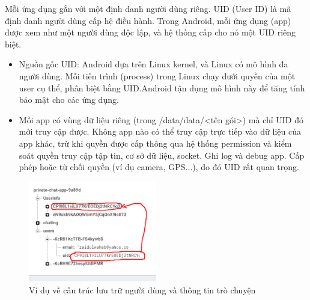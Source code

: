 \renewcommand{\labelitemi}{--}    
    \begin{flushleft}
        \hspace*{0.8cm}Mỗi ứng dụng gắn với một định danh người dùng riêng. UID (User ID) là mã định danh người dùng cấp hệ điều hành. Trong Android, mỗi ứng dụng (app) được xem như một người dùng độc lập, và hệ thống cấp cho nó một UID riêng biệt.
        \setlength{\leftmargini}{1.5cm}
        \begin{itemize}
            \item Nguồn gốc UID: Android dựa trên Linux kernel, và Linux có mô hình đa người dùng. Mỗi tiến trình (process) trong Linux chạy dưới quyền của một user cụ thể, phân biệt bằng UID.Android tận dụng mô hình này để tăng tính bảo mật cho các ứng dụng.
            \item Mỗi app có vùng dữ liệu riêng (trong /data/data/<tên gói>) mà chỉ UID đó mới truy cập được. Không app nào có thể truy cập trực tiếp vào dữ liệu của app khác, trừ khi quyền được cấp thông qua hệ thống permission và kiểm soát quyền truy cập tập tin, cơ sở dữ liệu, socket. Ghi log và debug app. Cấp phép hoặc từ chối quyền (ví dụ camera, GPS...), do đó UID rất quan trọng.
        \end{itemize}

        \begin{figure}[H] 
            \centering
            \includegraphics[width=0.5\textwidth]{images/uid.png}
            \caption{Ví dụ về cấu trúc lưu trữ người dùng và thông tin trò chuyện}
            \label{fig:android}
        \end{figure}
    \end{flushleft}

